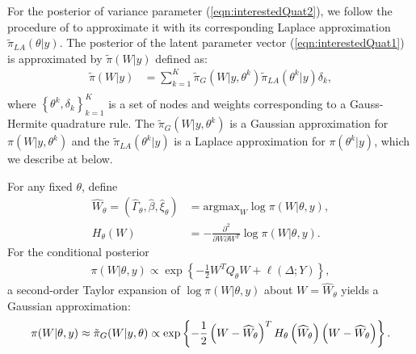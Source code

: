 \documentclass[ba]{imsart}
\begin{document}
For the posterior of variance parameter (\ref{eqn:interestedQuat2}), we follow the procedure of \cite{casecross} to approximate it with its corresponding Laplace approximation $\tilde{\pi}_{LA}(\theta|y)$. The posterior of the latent parameter vector (\ref{eqn:interestedQuat1}) is approximated by $\tilde{\pi}(W|y)$ defined as:
\begin{equation}\begin{aligned}\label{eqn:integration}
\tilde{\pi}(W|y) &= \sum_{k=1}^{K}
\tilde{\pi}_{G}(W|y,\theta^{k})
\tilde{\pi}_{LA}(\theta^{k}|y)\delta_{k} , \\
\end{aligned}\end{equation}
where $\left\{\theta^{k},\delta_{k}\right\}_{k=1}^{K}$ is a set of nodes and weights corresponding to a Gauss-Hermite quadrature rule. The $\tilde{\pi}_{G}(W|y,\theta^{k})$ is a Gaussian approximation for $\pi(W|y,\theta^{k})$ and the $\tilde{\pi}_{LA}(\theta^{k}|y)$ is a Laplace approximation for $\pi(\theta^{k}|y)$, which we describe at below.


For any fixed $\theta$, define
\begin{equation}\begin{aligned}\label{eqn:modeandhessian}
\widehat{W}_{\theta} = \left(\widehat{\Gamma}_{\theta},\widehat{\beta},\widehat{\xi}_{\theta}\right) &= \text{argmax}_{W}\log\pi(W|\theta,y) , \\ 
H_{\theta}(W) &= -\frac{\partial^{2}}{\partial W \partial W^{T}}\log\pi(W|\theta,y).
\end{aligned}\end{equation}
For the conditional posterior
\begin{equation}\begin{aligned}\label{eqn:condpost}
\pi(W|\theta,y) \propto \exp\left\lbrace -\frac{1}{2}W^{T}Q_{\theta}W + \ell\left(\Delta;Y\right)\right\rbrace,
\end{aligned}\end{equation}
a second-order Taylor expansion of $\log\pi(W|\theta,y)$ about $W = \widehat{W}_{\theta}$ yields a Gaussian approximation:
\begin{equation}\label{eqn:gaussianapprox}
\pi(W|\theta,y) \approx \tilde{\pi}_{G}(W|y,\theta) \propto \text{exp}\left\{-\frac{1}{2} \left(W-\widehat{W}_{\theta} \right)^T H_\theta\left(\widehat{W}_{\theta}\right) \left(W-\widehat{W}_{\theta} \right) \right\}. \\
\end{equation}
\end{document}
